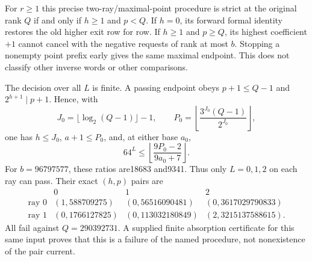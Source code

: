 \documentclass[11pt]{article}
\begin{document}
For $r\ge1$ this precise two-ray/maximal-point procedure is strict
at the original rank $Q$ if and only if $h\ge1$ and $p<Q$.
If $h=0$, its forward formal identity restores the old higher exit
row for row. If $h\ge1$ and $p\ge Q$, its highest coefficient $+1$
cannot cancel with the negative requests of rank at most $b$.
Stopping a nonempty point prefix early gives the same maximal endpoint.
This does not classify other inverse words or other comparisons.

The decision over all $L$ is finite. A passing endpoint obeys
$p+1\le Q-1$ and $2^{h+1}\mid p+1$. Hence, with
\[
 J_0=\lfloor\log_2(Q-1)\rfloor-1,\qquad
 P_0=\left\lfloor\frac{3^{J_0}(Q-1)}{2^{J_0}}\right\rfloor,
\]
one has $h\le J_0$, $a+1\le P_0$, and, at either base $a_0$,
\[
 64^L\le\left\lfloor\frac{9P_0-2}{9a_0+7}\right\rfloor.
 \tag{GE3}
\]
For $b=96797577$, these ratios are18683 and9341. Thus only
$L=0,1,2$ on each ray can pass. Their exact $(h,p)$ pairs are
\[
\begin{array}{c|ccc}
 &0&1&2\\ \hline
 \text{ray }0&(1,588709275)&(0,56516090481)&(0,3617029790833)\\
 \text{ray }1&(0,1766127825)&(0,113032180849)&(2,3215137588615).
\end{array}
\]
All fail against $Q=290392731$. A supplied finite absorption
certificate for this same input proves that this is a failure of
the named procedure, not nonexistence of the pair current.
\end{document}
